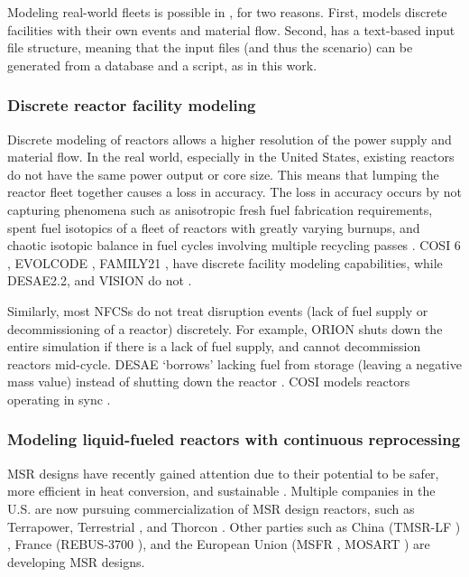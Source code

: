 Modeling real-world fleets is possible in \Cyclus, for two
reasons. First, \Cyclus models
discrete facilities with their own events and material flow.
Second, \Cyclus has a text-based input file structure, meaning that
the input files (and thus the scenario) can be generated from 
a database and a script, as in this work.


\subsubsection{Discrete reactor facility modeling}
Discrete modeling of reactors allows a higher resolution of the power supply and
material flow. In the real world, especially in the United States, existing
reactors do not have the same power output or core size. This means that
lumping the reactor fleet together causes a loss in accuracy. The loss in
accuracy occurs by not capturing phenomena such as anisotropic fresh fuel
fabrication requirements, spent fuel isotopics of a fleet of reactors
with greatly varying burnups, and chaotic isotopic balance in fuel
cycles involving multiple recycling passes \cite{huff_next_2010}.
COSI 6 \cite{eschbach_new_2013}, EVOLCODE \cite{alvarez-velarde_validation_2014},
FAMILY21 \cite{oecd_nuclear_2009},
have discrete facility modeling capabilities, while
DESAE2.2\cite{tsibulskiy_desae_2006}, and VISION \cite{jacobson_verifiable_2010} do
not \cite{boucher_international_2010}.

Similarly, most \glspl{NFCS} do not treat disruption events (lack of fuel supply
or decommissioning of a reactor)
discretely. For example, ORION shuts down the entire simulation if there
is a lack of fuel supply, and cannot decommission reactors mid-cycle.
DESAE `borrows' lacking fuel from storage (leaving a
negative mass value) instead of shutting down the reactor \cite{mccarthy_benchmark_2012}.
COSI models reactors operating in sync \cite{boucher_benchmark_2012}.


\subsubsection{Modeling liquid-fueled reactors with continuous reprocessing}
\label{sec:msr}
\gls{MSR} designs have recently gained attention due to 
their potential to be 
safer, more efficient in heat conversion, and sustainable \cite{serp_molten_2014}.
Multiple companies in the U.S. are now pursuing
commercialization of \gls{MSR} design reactors, such as Terrapower, Terrestrial \cite{leblanc_18_2017}, and
Thorcon \cite{jorgensen_19_2017}. Other parties such as China (TMSR-LF \cite{dai_17_2017}) ,
France (REBUS-3700 \cite{mourogov_potentialities_2006}),
and the European Union (MSFR \cite{heuer_towards_2014}, MOSART \cite{ignatiev_molten_2014})
are developing \gls{MSR} designs.

